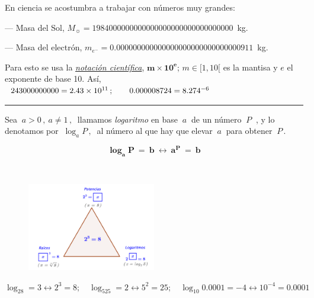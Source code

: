 \vspace{-3mm} En ciencia se acostumbra a trabajar con números muy grandes: 

\hspace{5mm} --- Masa del Sol, $M_{\sun}= 1984000000000000000000000000000000\, $ kg.

\hspace{5mm} --- Masa del electrón, $m_{e^{-}}=0.000000000000000000000000000000911\, $ kg. 

\vspace{2mm} Para esto se usa la \underline{\emph{notación científica}}, $\boldsymbol{m \times 10^e}$; $m\in [1,10[ $ es la mantisa y $e$ el exponente de base 10. Así,
$\ 243000000000=2.43\times 10^{11} \, ; \qquad 0.000008724=8.274\time 10^{-6}$

\vspace{-5mm}
\begin{flushright}
\rule{250pt}{0.1pt}	
\end{flushright}
\color{black}
\vspace{5mm}


\begin{definition}[ Logaritmos]

\begin{multicols}{2}
Sea $\ a>0\, , \ a\neq 1\, , \ $  	llamamos \emph{logaritmo} en base $ \ a \ $ de un número $ \ P \ $ , y lo denotamos por $\ \log_aP \, , \ $ al número al que hay que elevar $\ a \ $ para obtener $\ P \, . $

$$
\boxed{ \ \boldsymbol{
\log_a P \ = \ b \ \leftrightarrow \ a^P\ = \ b
} \ }
$$

$\quad$
\begin{figure}[H]
	\centering
	\includegraphics[width=0.5\textwidth]{img-reales/reales13.png}
	\end{figure}
\end{multicols}
\end{definition}


\begin{miejemplo}

$\log_28=3 \leftrightarrow 2^3=8;\quad \log_525=2 \leftrightarrow 5^2=25;\quad \log_{10}0.0001 =-4 \leftrightarrow 10^{-4}=0.0001$	
\end{miejemplo}

